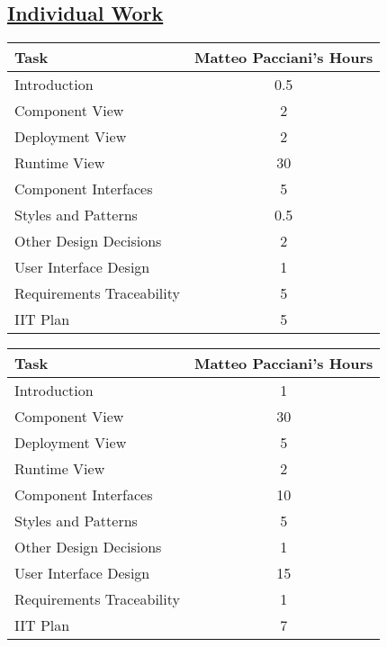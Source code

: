 \subsection[Individual Work]{\hyperlink{toc}{Individual Work}}
\vspace{2mm}
\begin{center}
	\begin{tabular}{| l | c |}
	\hline
	\textbf{Task} & \textbf{Matteo Pacciani's Hours} \\ \hline
	Introduction & 0.5 \\ \hline
	Component View & 2 \\ \hline
	Deployment View & 2 \\ \hline
	Runtime View & 30 \\ \hline
	Component Interfaces & 5 \\ \hline
	Styles and Patterns & 0.5 \\ \hline
	Other Design Decisions & 2 \\ \hline
	User Interface Design & 1 \\ \hline
	Requirements Traceability & 5 \\ \hline
	IIT Plan & 5 \\
	\hline	
	\end{tabular}
	
	\vspace{2mm}
	
	\begin{tabular}{| l | c |}
	\hline
	\textbf{Task} & \textbf{Matteo Pacciani's Hours} \\ \hline
	Introduction & 1 \\ \hline
	Component View & 30 \\ \hline
	Deployment View & 5 \\ \hline
	Runtime View & 2 \\ \hline
	Component Interfaces & 10 \\ \hline
	Styles and Patterns & 5 \\ \hline
	Other Design Decisions & 1 \\ \hline
	User Interface Design & 15 \\ \hline
	Requirements Traceability & 1 \\ \hline
	IIT Plan & 7 \\
	\hline
	\end{tabular}
\end{center}